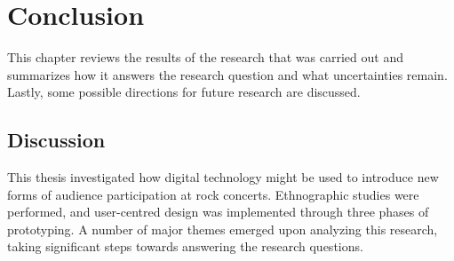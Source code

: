 \chapter{Conclusion}

This chapter reviews the results of the research that was carried out and summarizes how it answers the research question and what uncertainties remain. Lastly, some possible directions for future research are discussed.

\section{Discussion}

This thesis investigated how digital technology might be used to introduce new forms of audience participation at rock concerts. Ethnographic studies were performed, and user-centred design was implemented through three phases of prototyping. A number of major themes emerged upon analyzing this research, taking significant steps towards answering the research questions.







